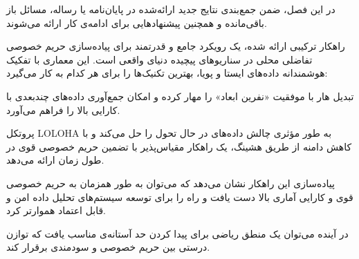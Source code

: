 

در این فصل، ضمن جمع‌بندی نتایج جدید ارائه‌شده در پایان‌نامه یا رساله، 
مسائل باز باقی‌مانده و همچنین پیشنهادهایی برای ادامه‌ی کار ارائه می‌شوند.

راهکار ترکیبی ارائه شده، یک رویکرد جامع و قدرتمند برای پیاده‌سازی حریم خصوصی تفاضلی محلی در سناریوهای پیچیده دنیای واقعی است. این معماری با تفکیک هوشمندانه داده‌های ایستا و پویا، بهترین تکنیک‌ها را برای هر کدام به کار می‌گیرد:

تبدیل هار با موفقیت «نفرین ابعاد» را مهار کرده و امکان جمع‌آوری داده‌های چندبعدی با کارایی بالا را فراهم می‌آورد.

پروتکل LOLOHA به طور مؤثری چالش داده‌های در حال تحول را حل می‌کند و با کاهش دامنه از طریق هشینگ، یک راهکار مقیاس‌پذیر با تضمین حریم خصوصی قوی در طول زمان ارائه می‌دهد.

پیاده‌سازی این راهکار نشان می‌دهد که می‌توان به طور همزمان به حریم خصوصی قوی و کارایی آماری بالا دست یافت و راه را برای توسعه سیستم‌های تحلیل داده امن و قابل اعتماد هموارتر کرد.

در آینده می‌توان یک منطق ریاضی برای پیدا کردن حد آستانه‌ی مناسب یافت که توازن درستی بین حریم خصوصی و سودمندی برقرار کند.